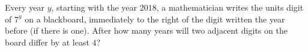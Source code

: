 Every year $y$, starting with the year $2018$, a mathematician writes the units digit of $7^y$ on a blackboard, immediately to the right of the digit written the year before (if there is one). After how many years will two adjacent digits on the board differ by at least $4$?
